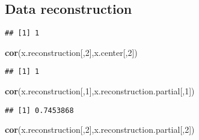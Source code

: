 \documentclass[]{article}
\newenvironment{Shaded}{\begin{snugshade}}{\end{snugshade}}
\newcommand{\KeywordTok}[1]{\textcolor[rgb]{0.13,0.29,0.53}{\textbf{{#1}}}}
\newcommand{\DecValTok}[1]{\textcolor[rgb]{0.00,0.00,0.81}{{#1}}}
\newcommand{\StringTok}[1]{\textcolor[rgb]{0.31,0.60,0.02}{{#1}}}
\newcommand{\NormalTok}[1]{{#1}}
\begin{document}
\subsection{Data reconstruction}\label{data-reconstruction}

\begin{Shaded}
\end{Shaded}

\begin{verbatim}
## [1] 1
\end{verbatim}

\begin{Shaded}
\begin{Highlighting}[]
\KeywordTok{cor}\NormalTok{(x.reconstruction[,}\DecValTok{2}\NormalTok{],x.center[,}\DecValTok{2}\NormalTok{])}
\end{Highlighting}
\end{Shaded}

\begin{verbatim}
## [1] 1
\end{verbatim}

\begin{Shaded}
\begin{Highlighting}[]
\KeywordTok{cor}\NormalTok{(x.reconstruction[,}\DecValTok{1}\NormalTok{],x.reconstruction.partial[,}\DecValTok{1}\NormalTok{])}
\end{Highlighting}
\end{Shaded}

\begin{verbatim}
## [1] 0.7453868
\end{verbatim}

\begin{Shaded}
\begin{Highlighting}[]
\KeywordTok{cor}\NormalTok{(x.reconstruction[,}\DecValTok{2}\NormalTok{],x.reconstruction.partial[,}\DecValTok{2}\NormalTok{])}
\end{Highlighting}
\end{Shaded}
\end{document}
